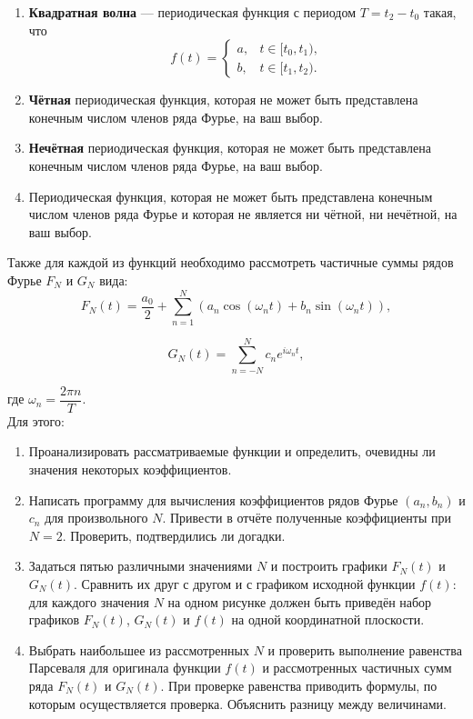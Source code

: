 \documentclass[a4paper, 12pt]{article}
\begin{document}
\begin{enumerate}
    \item \textbf{Квадратная волна} --- периодическая функция с периодом $T = t_2 - t_0$ такая, что
    \[
    f(t) =
    \begin{cases}
        a, & t \in [t_0, t_1), \\
        b, & t \in [t_1, t_2).
    \end{cases}
    \]
    
    \item \textbf{Чётная} периодическая функция, которая не может быть 
    представлена конечным числом членов ряда Фурье, на ваш выбор.

    \item \textbf{Нечётная} периодическая функция, которая не может быть 
    представлена конечным числом членов ряда Фурье, на ваш выбор.

    \item Периодическая функция, которая не может быть представлена 
    конечным числом членов ряда Фурье и которая не является 
    ни чётной, ни нечётной, на ваш выбор.
\end{enumerate}

Также для каждой из функций необходимо рассмотреть частичные суммы рядов Фурье $F_N$ и $G_N$ вида:
\[
F_N(t) = \frac{a_0}{2} + \sum_{n=1}^{N}
\left( a_n \cos(\omega_n t) + b_n \sin(\omega_n t) \right),
\] 

\[
G_N(t) = \sum_{n=-N}^{N} c_n e^{i \omega_n t},
\]

где $\omega_n = \dfrac{2\pi n}{T}$.\\

Для этого:

\begin{enumerate}
    \item Проанализировать рассматриваемые функции и определить,
    очевидны ли значения некоторых коэффициентов.

    \item Написать программу для вычисления коэффициентов рядов Фурье
    $(a_n, b_n)$ и $c_n$ для произвольного $N$.
    Привести в отчёте полученные коэффициенты при $N = 2$.
    Проверить, подтвердились ли догадки.

    \item Задаться пятью различными значениями $N$ и построить графики
    $F_N(t)$ и $G_N(t)$.
    Сравнить их друг с другом и с графиком исходной функции $f(t)$:
    для каждого значения $N$ на одном рисунке должен быть приведён
    набор графиков $F_N(t)$, $G_N(t)$ и $f(t)$ на одной координатной
    плоскости.

    \item Выбрать наибольшее из рассмотренных $N$ и проверить выполнение
    равенства Парсеваля для оригинала функции $f(t)$ и рассмотренных
    частичных сумм ряда $F_N(t)$ и $G_N(t)$.
    При проверке равенства приводить формулы, по которым осуществляется
    проверка. Объяснить разницу между величинами.
\end{enumerate}
\end{document}
